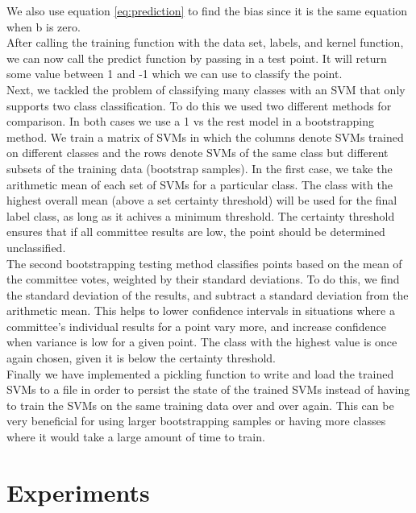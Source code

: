 \documentclass[journal]{IEEEtran}
\begin{document}
    We also use equation \ref{eq:prediction} to find the bias since it is the same equation when b is zero.\\

    After calling the training function with the data set, labels, and kernel function, we can now call the predict function by passing in a test point.  It will return some value between 1 and -1 which we can use to classify the point.\\

    Next, we tackled the problem of classifying many classes with an SVM that only supports two class classification. To do this we used two different methods for comparison. In both cases we use a 1 vs the rest model in a bootstrapping method. We train a matrix of SVMs in which the columns denote SVMs trained on different classes and the rows denote SVMs of the same class but different subsets of the training data (bootstrap samples). In the first case, we take the arithmetic mean of each set of SVMs for a particular class. The class with the highest overall mean (above a set certainty threshold) will be used for the final label class, as long as it achives a minimum threshold. The certainty threshold ensures that if all committee results are low, the point should be determined unclassified.\\

    The second bootstrapping testing method classifies points based on the mean of the committee votes, weighted by their standard deviations. To do this, we find the standard deviation of the results, and subtract a standard deviation from the arithmetic mean. This helps to lower confidence intervals in situations where a committee’s individual results for a point vary more, and increase confidence when variance is low for a given point. The class with the highest value is once again chosen, given it is below the certainty threshold. \\

    Finally we have implemented a pickling function to write and load the trained SVMs to a file in order to persist the state of the trained SVMs instead of having to train the SVMs on the same training data over and over again. This can be very beneficial for using larger bootstrapping samples or having more classes where it would take a large amount of time to train.\\




\section{Experiments}
\end{document}

